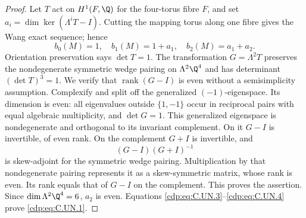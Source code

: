 \begin{proof}
Let $T$ act on $H^1(F,\Q)$ for the four-torus fibre $F$, and set
$a_i=\dim\ker(\Lambda^iT-I)$. Cutting the mapping torus along one
fibre gives the Wang exact sequence; hence
\[
 b_0(M)=1,\quad b_1(M)=1+a_1,\quad b_2(M)=a_1+a_2.
                                                        \tag{C.UN.4}\label{cdp:eq:C.UN.4}
\]
Orientation preservation says $\det T=1$. The transformation
$G=\Lambda^2T$ preserves the nondegenerate symmetric wedge pairing
on $\Lambda^2\Q^4$ and has determinant $(\det T)^3=1$.
We verify that $\operatorname{rank}(G-I)$ is even without a
semisimplicity assumption. Complexify and split off the generalized
$(-1)$-eigenspace. Its dimension is even: all eigenvalues outside
$\{1,-1\}$ occur in reciprocal pairs with equal algebraic
multiplicity, and $\det G=1$. This generalized eigenspace is
nondegenerate and orthogonal to its invariant complement. On it
$G-I$ is invertible, of even rank. On the complement $G+I$ is
invertible, and
\[
                         (G-I)(G+I)^{-1}
\]
is skew-adjoint for the symmetric wedge pairing. Multiplication by
that nondegenerate pairing represents it as a skew-symmetric matrix,
whose rank is even. Its rank equals that of $G-I$ on the complement.
This proves the assertion. Since $\dim\Lambda^2\Q^4=6$, $a_2$ is
even. Equations \eqref{cdp:eq:C.UN.3}--\eqref{cdp:eq:C.UN.4} prove \eqref{cdp:eq:C.UN.1}.
\end{proof}


